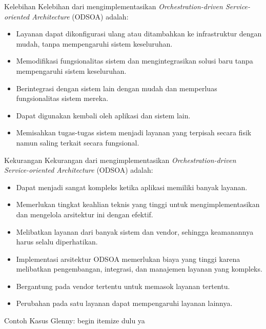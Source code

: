 \documentclass{beamer}
\begin{document}
	\begin{frame}{Kelebihan}
		Kelebihan dari mengimplementasikan \textit{Orchestration-driven Service-oriented Architecture} (ODSOA) adalah:
		\begin{itemize}
			\item Layanan dapat dikonfigurasi ulang atau ditambahkan ke infrastruktur dengan mudah, tanpa mempengaruhi sistem keseluruhan.
			\item Memodifikasi fungsionalitas sistem dan mengintegrasikan solusi baru tanpa mempengaruhi sistem keseluruhan.
			\item Berintegrasi dengan sistem lain dengan mudah dan memperluas fungsionalitas sistem mereka.
			\item Dapat digunakan kembali oleh aplikasi dan sistem lain.
			\item Memisahkan tugas-tugas sistem menjadi layanan yang terpisah secara fisik namun saling terkait secara fungsional.
			
		\end{itemize}
	\end{frame}
	
	\begin{frame}{Kekurangan}
		Kekurangan dari mengimplementasikan \textit{Orchestration-driven Service-oriented Architecture} (ODSOA) adalah:
		\begin{itemize}
			\item Dapat menjadi sangat kompleks ketika aplikasi memiliki banyak layanan.
			\item Memerlukan tingkat keahlian teknis yang tinggi untuk mengimplementasikan dan mengelola arsitektur ini dengan efektif.
			\item Melibatkan layanan dari banyak sistem dan vendor, sehingga keamanannya harus selalu diperhatikan.
			\item Implementasi arsitektur ODSOA memerlukan biaya yang tinggi karena melibatkan pengembangan, integrasi, dan manajemen layanan yang kompleks.
			\item Bergantung pada vendor tertentu untuk memasok layanan tertentu.
			\item Perubahan pada satu layanan dapat mempengaruhi layanan lainnya.
		\end{itemize}
	\end{frame}
	
	\begin{frame}{Contoh Kasus}
		\text Glenny: begin itemize dulu ya
	\end{frame}
	
\end{document}
